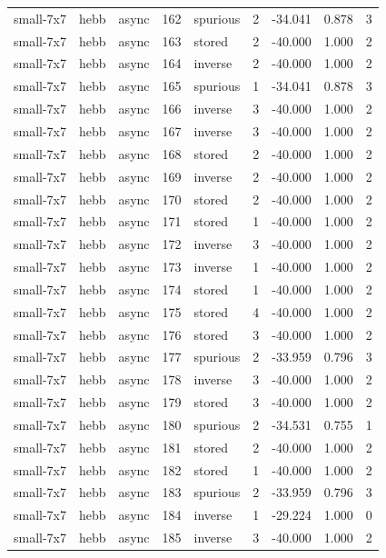 \begin{tabular}{lllrlrrrr}
small-7x7 & hebb & async & 162 & spurious & 2 & -34.041 & 0.878 & 3 \\
small-7x7 & hebb & async & 163 & stored & 2 & -40.000 & 1.000 & 2 \\
small-7x7 & hebb & async & 164 & inverse & 2 & -40.000 & 1.000 & 2 \\
small-7x7 & hebb & async & 165 & spurious & 1 & -34.041 & 0.878 & 3 \\
small-7x7 & hebb & async & 166 & inverse & 3 & -40.000 & 1.000 & 2 \\
small-7x7 & hebb & async & 167 & inverse & 3 & -40.000 & 1.000 & 2 \\
small-7x7 & hebb & async & 168 & stored & 2 & -40.000 & 1.000 & 2 \\
small-7x7 & hebb & async & 169 & inverse & 2 & -40.000 & 1.000 & 2 \\
small-7x7 & hebb & async & 170 & stored & 2 & -40.000 & 1.000 & 2 \\
small-7x7 & hebb & async & 171 & stored & 1 & -40.000 & 1.000 & 2 \\
small-7x7 & hebb & async & 172 & inverse & 3 & -40.000 & 1.000 & 2 \\
small-7x7 & hebb & async & 173 & inverse & 1 & -40.000 & 1.000 & 2 \\
small-7x7 & hebb & async & 174 & stored & 1 & -40.000 & 1.000 & 2 \\
small-7x7 & hebb & async & 175 & stored & 4 & -40.000 & 1.000 & 2 \\
small-7x7 & hebb & async & 176 & stored & 3 & -40.000 & 1.000 & 2 \\
small-7x7 & hebb & async & 177 & spurious & 2 & -33.959 & 0.796 & 3 \\
small-7x7 & hebb & async & 178 & inverse & 3 & -40.000 & 1.000 & 2 \\
small-7x7 & hebb & async & 179 & stored & 3 & -40.000 & 1.000 & 2 \\
small-7x7 & hebb & async & 180 & spurious & 2 & -34.531 & 0.755 & 1 \\
small-7x7 & hebb & async & 181 & stored & 2 & -40.000 & 1.000 & 2 \\
small-7x7 & hebb & async & 182 & stored & 1 & -40.000 & 1.000 & 2 \\
small-7x7 & hebb & async & 183 & spurious & 2 & -33.959 & 0.796 & 3 \\
small-7x7 & hebb & async & 184 & inverse & 1 & -29.224 & 1.000 & 0 \\
small-7x7 & hebb & async & 185 & inverse & 3 & -40.000 & 1.000 & 2 \\

\end{tabular}
